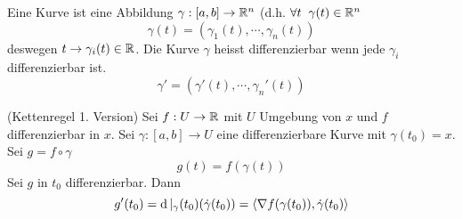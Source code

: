 \begin{Def}
  Eine Kurve ist eine Abbildung $\gamma:[a,b]\rightarrow\mathbb{R}^n$ (d.h. $\forall t\hspace{2mm}\gamma(t)\in\mathbb{R}^n$ 
  \[\gamma(t)=(\gamma_1(t),\cdots,\gamma_n(t))\]
  deswegen $t\rightarrow\gamma_i(t)\in\mathbb{R}$. Die Kurve $\gamma$ heisst differenzierbar wenn jede $\gamma_i$ differenzierbar ist.
  \[\gamma'=(\gamma'(t),\cdots,\gamma_n'(t))\]
\end{Def}
\begin{Sat}(Kettenregel 1. Version) Sei $f:U\rightarrow\mathbb{R}$ mit $U$ Umgebung von $x$ und $f$ differenzierbar in $x$. Sei $\gamma:[a,b]\to U$ eine differenzierbare Kurve mit $\gamma(t_0)=x$. Sei $g=f\circ \gamma$
  \[g(t)=f(\gamma(t))\]
  Sei $g$ in $t_0$ differenzierbar. Dann
  \[g'(t_0)=\operatorname{d}|_\gamma(t_0)(\dot\gamma(t_0))=\langle \nabla f(\gamma(t_0)),\dot\gamma(t_0) \rangle\]
\end{Sat}
